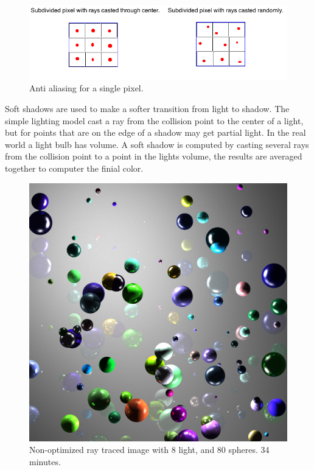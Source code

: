 \documentclass[11pt,a4paper,oneside]{article}
\begin{document}
\begin{figure}[H]
\includegraphics[scale=0.6]{aa.png} 
\caption{Anti aliasing for a single pixel.}
\label{aa}
\end{figure}

Soft shadows are used to make a softer transition from light to shadow.     The simple lighting model cast a ray from the collision point to the center of a light, but for points that are on the edge of a shadow may get partial light.  In the real world a light bulb has volume.  A soft shadow is computed by casting several rays from the collision point to a point in the lights volume, the results are averaged together to computer the finial color.


\begin{figure}[H]
\begin{center}
\includegraphics[scale=0.25]{result1.png} 
\caption{Non-optimized ray traced image with 8 light, and 80 spheres.  34 minutes.}
\label{result1}
\end{center}
\end{figure}
\end{document}
